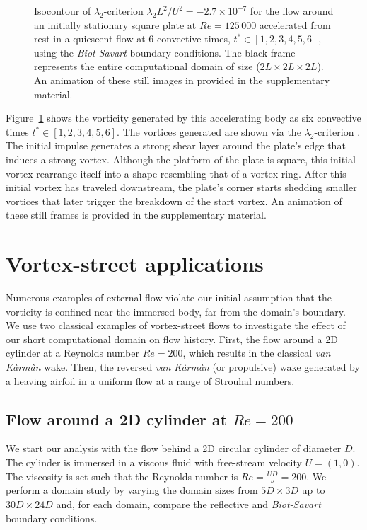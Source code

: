 \documentclass[preprint,12pt]{elsarticle}
\begin{document}
\begin{figure}
\begin{subfigure}{.33\textwidth}
    \end{subfigure}
    \caption{Isocontour of $\lambda_2$-criterion $\lambda_2L^2/U^2=-2.7\times10^{-7}$ for the flow around an initially stationary square plate at $Re=125\,000$ accelerated from rest in a quiescent flow at 6 convective times, $t^*\in [1,2,3,4,5,6]$, using the \emph{Biot-Savart} boundary conditions. The black frame represents the entire computational domain of size ($2L\times2L\times2L$). An animation of these still images in provided in the supplementary material.}
    \label{fig:disk_flow_3}
\end{figure}

Figure~\ref{fig:disk_flow_3} shows the vorticity generated by this accelerating body as six convective times $t^*\in[1,2,3,4,5,6]$. The vortices generated are shown via the $\lambda_2$-criterion \cite{JEong1995OnVortex}. The initial impulse generates a strong shear layer around the plate's edge that induces a strong vortex. Although the platform of the plate is square, this initial vortex rearrange itself into a shape resembling that of a vortex ring. After this initial vortex has traveled downstream, the plate's corner starts shedding smaller vortices that later trigger the breakdown of the start vortex. An animation of these still frames is provided in the supplementary material.

\section{Vortex-street applications}

Numerous examples of external flow violate our initial assumption that the vorticity is confined near the immersed body, far from the domain's boundary. We use two classical examples of vortex-street flows to investigate the effect of our short computational domain on flow history. First, the flow around a 2D cylinder at a Reynolds number $Re=200$, which results in the classical \emph{van K\`arm\`an} wake. Then, the reversed \emph{van K\`arm\`an} (or propulsive) wake generated by a heaving airfoil in a uniform flow at a range of Strouhal numbers.

\subsection{Flow around a 2D cylinder at $Re=200$}

We start our analysis with the flow behind a 2D circular cylinder of diameter $D$. The cylinder is immersed in a viscous fluid with free-stream velocity $U=(1,0)$. The viscosity is set such that the Reynolds number is $Re=\frac{UD}{\nu}=200$. We perform a domain study by varying the domain sizes from $5D\times3D$ up to $30D\times24D$ and, for each domain, compare the reflective and \emph{Biot-Savart} boundary conditions.
\end{document}
